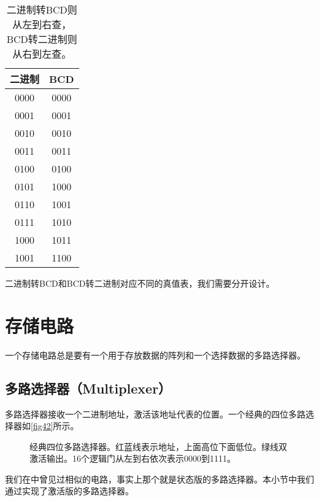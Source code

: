 \begin{table}[!ht]
\centering
\begin{tabular}{|c|c|}
\hline
二进制&BCD\\\hline
0000&0000\\\hline
0001&0001\\\hline
0010&0010\\\hline
0011&0011\\\hline
0100&0100\\\hline
0101&1000\\\hline
0110&1001\\\hline
0111&1010\\\hline
1000&1011\\\hline
1001&1100\\\hline
\end{tabular}
\caption{二进制转BCD则从左到右查，BCD转二进制则从右到左查。}\label{tab12}
\end{table}

二进制转BCD和BCD转二进制对应不同的真值表，我们需要分开设计。

\section{存储电路}
一个存储电路总是要有一个用于存放数据的阵列和一个选择数据的多路选择器。

\subsection{多路选择器（Multiplexer）}
多路选择器接收一个二进制地址，激活该地址代表的位置。一个经典的四位多路选择器如\autoref{fig42}所示。

\begin{figure}[!ht]
\centering
{}%
%
\caption{经典四位多路选择器。红蓝线表示地址，上面高位下面低位。绿线双激活输出。16个逻辑门从左到右依次表示0000到1111。}\label{fig42}
\end{figure}

我们在中曾见过相似的电路，事实上那个就是状态版的多路选择器。本小节中我们通过实现了激活版的多路选择器。

